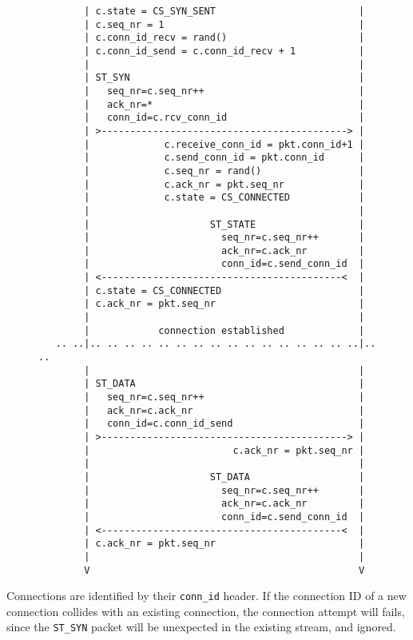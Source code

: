 \documentclass[11pt,a4paper,oneside,draft]{article}
\begin{document}
{\begin{figure}
{\begin{verbatim}
        | c.state = CS_SYN_SENT                         |
        | c.seq_nr = 1                                  |
        | c.conn_id_recv = rand()                       |
        | c.conn_id_send = c.conn_id_recv + 1           |
        |                                               |
        | ST_SYN                                        |
        |   seq_nr=c.seq_nr++                           |
        |   ack_nr=*                                    |
        |   conn_id=c.rcv_conn_id                       |
        | >-------------------------------------------> |
        |             c.receive_conn_id = pkt.conn_id+1 |
        |             c.send_conn_id = pkt.conn_id      |
        |             c.seq_nr = rand()                 |
        |             c.ack_nr = pkt.seq_nr             |
        |             c.state = CS_CONNECTED            |
        |                                               |
        |                     ST_STATE                  |
        |                       seq_nr=c.seq_nr++       |
        |                       ack_nr=c.ack_nr         |
        |                       conn_id=c.send_conn_id  |
        | <------------------------------------------<  |
        | c.state = CS_CONNECTED                        |
        | c.ack_nr = pkt.seq_nr                         |
        |                                               |
        |            connection established             |
   .. ..|.. .. .. .. .. .. .. .. .. .. .. .. .. .. .. ..|.. ..
        |                                               |
        | ST_DATA                                       |
        |   seq_nr=c.seq_nr++                           |
        |   ack_nr=c.ack_nr                             |
        |   conn_id=c.conn_id_send                      |
        | >-------------------------------------------> |
        |                         c.ack_nr = pkt.seq_nr |
        |                                               |
        |                     ST_DATA                   |
        |                       seq_nr=c.seq_nr++       |
        |                       ack_nr=c.ack_nr         |
        |                       conn_id=c.send_conn_id  |
        | <------------------------------------------<  |
        | c.ack_nr = pkt.seq_nr                         |
        |                                               |
        V                                               V
\end{verbatim}}
\end{figure}}

Connections are identified by their {\tt conn\_id} header. If the connection ID of a new connection collides with an existing connection, the connection attempt will fails, since the {\tt ST\_SYN} packet will be unexpected in the existing stream, and ignored.
\end{document}
